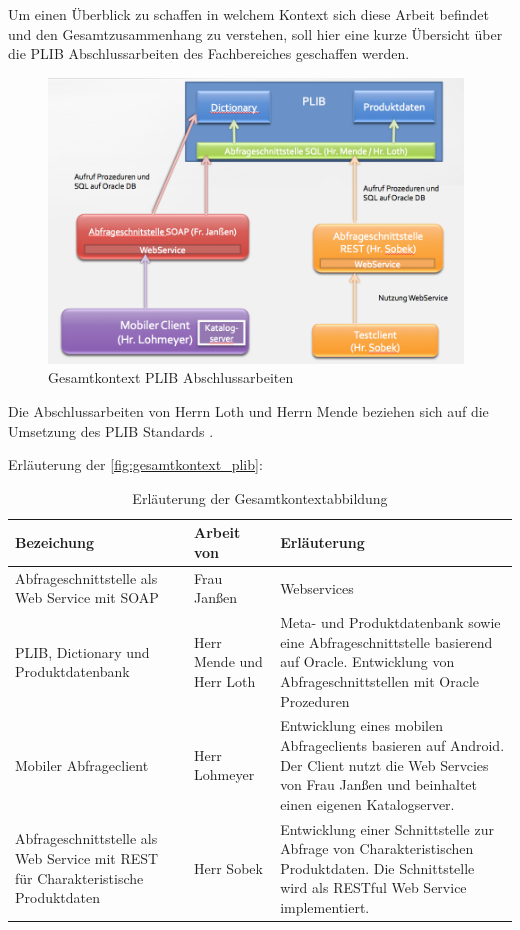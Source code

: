 Um einen Überblick zu schaffen in welchem Kontext sich diese Arbeit befindet und den Gesamtzusammenhang zu verstehen, soll hier eine kurze Übersicht über die PLIB Abschlussarbeiten des Fachbereiches geschaffen werden. 


\begin{figure}[htbp]
	\centering
		\includegraphics[width=0.98\textwidth]{images/gesamtkontext_plib.png}
	\caption{Gesamtkontext PLIB Abschlussarbeiten}
	\label{fig:gesamtkontext_plib}
\end{figure}

Die Abschlussarbeiten von Herrn Loth und Herrn Mende beziehen sich auf die Umsetzung des PLIB Standards  \citep[Vergl.][]{iso13584-42}.

Erläuterung der \autoref{fig:gesamtkontext_plib}: 

\begin{table}[!hbt]\vspace{1ex}\centering\begin{tabular}{p{4cm}p{4cm}p{6cm}}
\hline
Bezeichung & Arbeit von & Erläuterung\\
\hline
\hline
Abfrageschnittstelle als Web Service mit SOAP &  Frau Janßen & Webservices  \\
\hline
PLIB, Dictionary und Produktdatenbank &  Herr Mende und Herr Loth & Meta- und Produktdatenbank  sowie eine Abfrageschnittstelle basierend auf Oracle. Entwicklung von Abfrageschnittstellen mit Oracle Prozeduren \\
\hline
Mobiler Abfrageclient & Herr Lohmeyer & Entwicklung eines mobilen Abfrageclients basieren auf Android. Der Client nutzt die Web Servcies von Frau Janßen und beinhaltet einen eigenen Katalogserver. \\
\hline
Abfrageschnittstelle als Web Service mit REST für Charakteristische Produktdaten & Herr Sobek & Entwicklung einer Schnittstelle zur Abfrage von Charakteristischen Produktdaten. Die Schnittstelle wird als RESTful Web Service implementiert. \\
\hline
\end{tabular}
\caption{\label{tab.gesamtkontext}Erläuterung der Gesamtkontextabbildung}
\vspace{2ex}\end{table}

